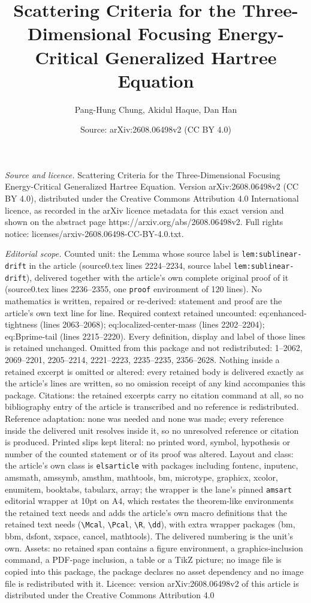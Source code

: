 \documentclass[10pt,a4paper]{amsart}
\title[Scattering Criteria for the Three-Dimensional Focusing Energ]{Scattering Criteria for the Three-Dimensional Focusing Energy-Critical Generalized Hartree Equation}
\author{Pang-Hung Chung, Akidul Haque, Dan Han}
\date{Source: arXiv:2608.06498v2 (CC BY 4.0)}
\begin{document}
\maketitle

\noindent\emph{Source and licence.} Scattering Criteria for the Three-Dimensional Focusing Energy-Critical Generalized Hartree Equation. Version arXiv:2608.06498v2 (CC BY 4.0), distributed under the Creative Commons Attribution 4.0 International licence, as recorded in the arXiv licence metadata for this exact version and shown on the abstract page https://arxiv.org/abs/2608.06498v2. Full rights notice: licenses/arxiv-2608.06498-CC-BY-4.0.txt.\par\smallskip

\noindent\textit{Editorial scope.} Counted unit: the Lemma whose source label is \texttt{lem:sublinear-drift} in the article (source0.tex lines 2224--2234, source label \texttt{lem:sublinear-drift}), delivered together with the article's own complete original proof of it (source0.tex lines 2236--2355, one \texttt{proof} environment of 120 lines). No mathematics is written, repaired or re-derived: statement and proof are the article's own text line for line. Required context retained uncounted: eq:enhanced-tightness (lines 2063--2068); eq:localized-center-mass (lines 2202--2204); eq:Bprime-tail (lines 2215--2220). Every definition, display and label of those lines is retained unchanged. Omitted from this package and not redistributed: 1--2062, 2069--2201, 2205--2214, 2221--2223, 2235--2235, 2356--2628. Nothing inside a retained excerpt is omitted or altered: every retained body is delivered exactly as the article's lines are written, so no omission receipt of any kind accompanies this package. Citations: the retained excerpts carry no citation command at all, so no bibliography entry of the article is transcribed and no reference is redistributed. Reference adaptation: none was needed and none was made; every reference inside the delivered unit resolves inside it, so no unresolved reference or citation is produced. Printed slips kept literal: no printed word, symbol, hypothesis or number of the counted statement or of its proof was altered. Layout and class: the article's own class is \texttt{elsarticle} with packages including fontenc, inputenc, amsmath, amssymb, amsthm, mathtools, bm, microtype, graphicx, xcolor, enumitem, booktabs, tabularx, array; the wrapper is the lane's pinned \texttt{amsart} editorial wrapper at 10pt on A4, which restates the theorem-like environments the retained text needs and adds the article's own macro definitions that the retained text needs (\texttt{\textbackslash Mcal}, \texttt{\textbackslash Pcal}, \texttt{\textbackslash R}, \texttt{\textbackslash dd}), with extra wrapper packages (bm, bbm, dsfont, xspace, cancel, mathtools). The delivered numbering is the unit's own. Assets: no retained span contains a figure environment, a graphics-inclusion command, a PDF-page inclusion, a table or a TikZ picture; no image file is copied into this package, the package declares no asset dependency and no image file is redistributed with it. Licence: version arXiv:2608.06498v2 of this article is distributed under the Creative Commons Attribution 4.0 
\end{document}
